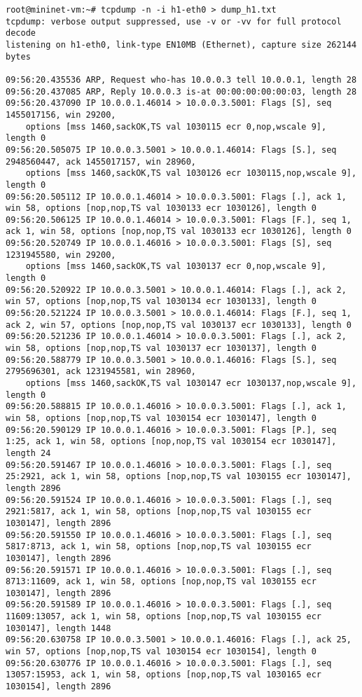 \documentclass[12pt,letterpaper]{article}
\begin{document}
\begin{tiny}
\begin{verbatim}
root@mininet-vm:~# tcpdump -n -i h1-eth0 > dump_h1.txt
tcpdump: verbose output suppressed, use -v or -vv for full protocol decode
listening on h1-eth0, link-type EN10MB (Ethernet), capture size 262144 bytes

09:56:20.435536 ARP, Request who-has 10.0.0.3 tell 10.0.0.1, length 28
09:56:20.437085 ARP, Reply 10.0.0.3 is-at 00:00:00:00:00:03, length 28
09:56:20.437090 IP 10.0.0.1.46014 > 10.0.0.3.5001: Flags [S], seq 1455017156, win 29200,
    options [mss 1460,sackOK,TS val 1030115 ecr 0,nop,wscale 9], length 0
09:56:20.505075 IP 10.0.0.3.5001 > 10.0.0.1.46014: Flags [S.], seq 2948560447, ack 1455017157, win 28960,
    options [mss 1460,sackOK,TS val 1030126 ecr 1030115,nop,wscale 9], length 0
09:56:20.505112 IP 10.0.0.1.46014 > 10.0.0.3.5001: Flags [.], ack 1, win 58, options [nop,nop,TS val 1030133 ecr 1030126], length 0
09:56:20.506125 IP 10.0.0.1.46014 > 10.0.0.3.5001: Flags [F.], seq 1, ack 1, win 58, options [nop,nop,TS val 1030133 ecr 1030126], length 0
09:56:20.520749 IP 10.0.0.1.46016 > 10.0.0.3.5001: Flags [S], seq 1231945580, win 29200,
    options [mss 1460,sackOK,TS val 1030137 ecr 0,nop,wscale 9], length 0
09:56:20.520922 IP 10.0.0.3.5001 > 10.0.0.1.46014: Flags [.], ack 2, win 57, options [nop,nop,TS val 1030134 ecr 1030133], length 0
09:56:20.521224 IP 10.0.0.3.5001 > 10.0.0.1.46014: Flags [F.], seq 1, ack 2, win 57, options [nop,nop,TS val 1030137 ecr 1030133], length 0
09:56:20.521236 IP 10.0.0.1.46014 > 10.0.0.3.5001: Flags [.], ack 2, win 58, options [nop,nop,TS val 1030137 ecr 1030137], length 0
09:56:20.588779 IP 10.0.0.3.5001 > 10.0.0.1.46016: Flags [S.], seq 2795696301, ack 1231945581, win 28960,
    options [mss 1460,sackOK,TS val 1030147 ecr 1030137,nop,wscale 9], length 0
09:56:20.588815 IP 10.0.0.1.46016 > 10.0.0.3.5001: Flags [.], ack 1, win 58, options [nop,nop,TS val 1030154 ecr 1030147], length 0
09:56:20.590129 IP 10.0.0.1.46016 > 10.0.0.3.5001: Flags [P.], seq 1:25, ack 1, win 58, options [nop,nop,TS val 1030154 ecr 1030147], length 24
09:56:20.591467 IP 10.0.0.1.46016 > 10.0.0.3.5001: Flags [.], seq 25:2921, ack 1, win 58, options [nop,nop,TS val 1030155 ecr 1030147], length 2896
09:56:20.591524 IP 10.0.0.1.46016 > 10.0.0.3.5001: Flags [.], seq 2921:5817, ack 1, win 58, options [nop,nop,TS val 1030155 ecr 1030147], length 2896
09:56:20.591550 IP 10.0.0.1.46016 > 10.0.0.3.5001: Flags [.], seq 5817:8713, ack 1, win 58, options [nop,nop,TS val 1030155 ecr 1030147], length 2896
09:56:20.591571 IP 10.0.0.1.46016 > 10.0.0.3.5001: Flags [.], seq 8713:11609, ack 1, win 58, options [nop,nop,TS val 1030155 ecr 1030147], length 2896
09:56:20.591589 IP 10.0.0.1.46016 > 10.0.0.3.5001: Flags [.], seq 11609:13057, ack 1, win 58, options [nop,nop,TS val 1030155 ecr 1030147], length 1448
09:56:20.630758 IP 10.0.0.3.5001 > 10.0.0.1.46016: Flags [.], ack 25, win 57, options [nop,nop,TS val 1030154 ecr 1030154], length 0
09:56:20.630776 IP 10.0.0.1.46016 > 10.0.0.3.5001: Flags [.], seq 13057:15953, ack 1, win 58, options [nop,nop,TS val 1030165 ecr 1030154], length 2896
\end{verbatim}
\end{tiny}
\end{document}
